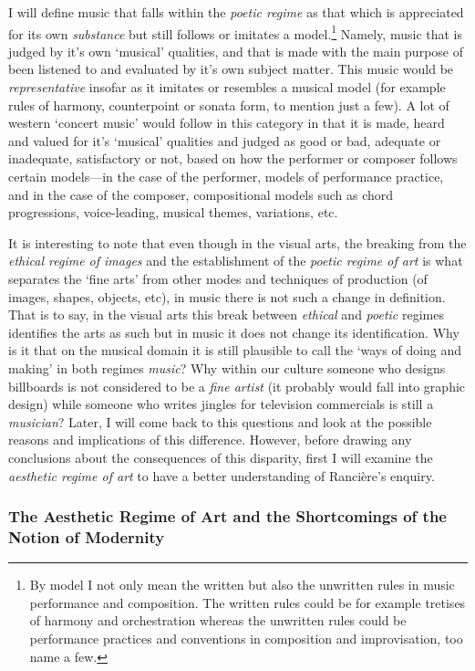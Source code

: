 I will define music that falls within the \emph{poetic regime} as that which is appreciated for its own \emph{substance} but still follows or imitates a model.\footnote{By model I not only mean the written but also the unwritten rules in music performance and composition. The written rules could be for example tretises of harmony and orchestration whereas the unwritten rules could be performance practices and conventions in composition and improvisation, too name a few.} Namely, music that is judged by it's own `musical' qualities, and that is made with the main purpose of been listened to and evaluated by it's own subject matter. This music would be \emph{representative} insofar as it imitates or resembles a musical model (for example rules of harmony, counterpoint or sonata form, to mention just a few). A lot of western `concert music' would follow in this category in that it is made, heard and valued for it's `musical' qualities and judged as good or bad, adequate or inadequate, satisfactory or not, based on how the performer or composer follows certain models---in the case of the performer, models of performance practice, and in the case of the composer, compositional models such as chord progressions, \mbox{voice-leading}, musical themes, variations, etc. 

It is interesting to note that even though in the visual arts, the breaking from the \emph{ethical regime of images} and the establishment of the \emph{poetic regime of art} is what separates the `fine arts' from other modes and techniques of production (of images, shapes, objects, etc), in music there is not such a change in definition. That is to say, in the visual arts this break between \emph{ethical} and \emph{poetic} regimes identifies the arts as such but in music it does not change its identification. Why is it that on the musical domain it is still plausible to call the `ways of doing and making' in both regimes \emph{music}? Why within our culture someone who designs billboards is not considered to be a \emph{fine artist} (it probably would fall into graphic design) while someone who writes jingles for television commercials is still a \emph{musician}? Later, I will come back to this questions and look at the possible reasons and implications of this difference. However, before drawing any conclusions about the consequences of this disparity, first I will examine the \emph{aesthetic regime of art} to have a better understanding of Ranci\`{e}re's enquiry.

\subsubsection{The Aesthetic Regime of Art and the Shortcomings of the Notion of Modernity}

